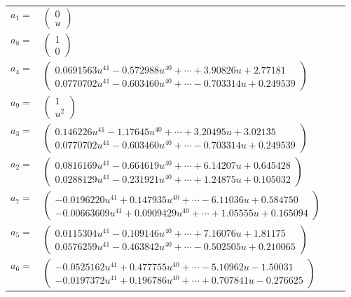 \documentclass[1p]{elsarticle_modified}
\theoremstyle{definition}
\begin{document}
\begin{tabular}{m{7pt} m{180pt} m{7pt} m{180pt} }
\flushright $a_{1}=$&$\begin{pmatrix}0\\u\end{pmatrix}$ \\
\flushright $a_{8}=$&$\begin{pmatrix}1\\0\end{pmatrix}$ \\
\flushright $a_{4}=$&$\begin{pmatrix}0.0691563 u^{41}-0.572988 u^{40}+\cdots+3.90826 u+2.77181\\0.0770702 u^{41}-0.603460 u^{40}+\cdots-0.703314 u+0.249539\end{pmatrix}$ \\
\flushright $a_{9}=$&$\begin{pmatrix}1\\u^2\end{pmatrix}$ \\
\flushright $a_{3}=$&$\begin{pmatrix}0.146226 u^{41}-1.17645 u^{40}+\cdots+3.20495 u+3.02135\\0.0770702 u^{41}-0.603460 u^{40}+\cdots-0.703314 u+0.249539\end{pmatrix}$ \\
\flushright $a_{2}=$&$\begin{pmatrix}0.0816169 u^{41}-0.664619 u^{40}+\cdots+6.14207 u+0.645428\\0.0288129 u^{41}-0.231921 u^{40}+\cdots+1.24875 u+0.105032\end{pmatrix}$ \\
\flushright $a_{7}=$&$\begin{pmatrix}-0.0196220 u^{41}+0.147935 u^{40}+\cdots-6.11036 u+0.584750\\-0.00663609 u^{41}+0.0909429 u^{40}+\cdots+1.05555 u+0.165094\end{pmatrix}$ \\
\flushright $a_{5}=$&$\begin{pmatrix}0.0115304 u^{41}-0.109146 u^{40}+\cdots+7.16076 u+1.81175\\0.0576259 u^{41}-0.463842 u^{40}+\cdots-0.502505 u+0.210065\end{pmatrix}$ \\
\flushright $a_{6}=$&$\begin{pmatrix}-0.0525162 u^{41}+0.477755 u^{40}+\cdots-5.10962 u-1.50031\\-0.0197372 u^{41}+0.196786 u^{40}+\cdots+0.707841 u-0.276625\end{pmatrix}$ \\

\end{tabular}
\end{document}

